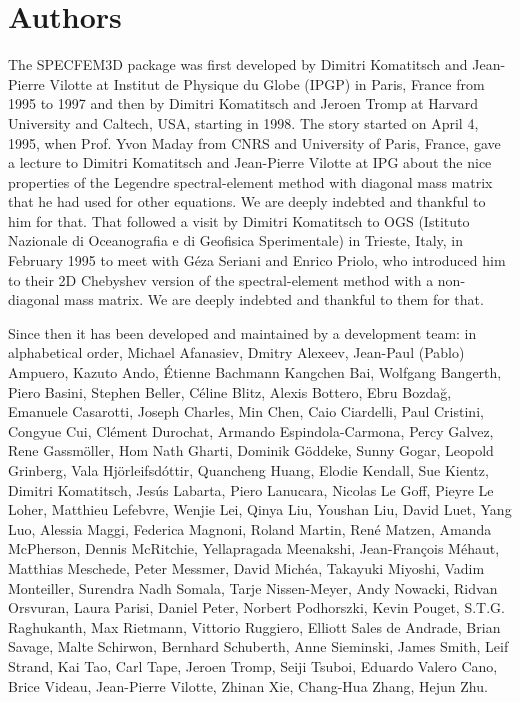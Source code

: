 \section*{Authors}

\noindent The SPECFEM3D package was first developed by Dimitri
Komatitsch and Jean-Pierre Vilotte at Institut de Physique du Globe
(IPGP) in Paris, France from 1995 to 1997 and then by Dimitri Komatitsch
and Jeroen Tromp at Harvard University and Caltech, USA, starting in 1998.
The story started on April 4, 1995, when Prof. Yvon Maday from CNRS and University of Paris, France, gave a lecture to
Dimitri Komatitsch and Jean-Pierre Vilotte at IPG about the nice properties of the Legendre spectral-element method with diagonal mass matrix that he had used for
other equations. We are deeply indebted and thankful to him for that.
That followed a visit by Dimitri Komatitsch to OGS (Istituto Nazionale di Oceanografia e di Geofisica Sperimentale) in Trieste, Italy, in February 1995
to meet with G\'eza Seriani and Enrico Priolo, who introduced him to their 2D Chebyshev version of the spectral-element method with a non-diagonal mass matrix.
We are deeply indebted and thankful to them for that.\newline

Since then it has been developed and maintained by a development team: in alphabetical order,
Michael Afanasiev,
Dmitry Alexeev,
Jean-Paul (Pablo) Ampuero,
Kazuto Ando,
\'Etienne Bachmann
Kangchen Bai,
Wolfgang Bangerth,
Piero Basini,
Stephen Beller,
C\'eline Blitz,
Alexis Bottero,
Ebru Bozda\u{g},
Emanuele Casarotti,
Joseph Charles,
Min Chen,
Caio Ciardelli,
Paul Cristini,
Congyue Cui,
Cl\'ement Durochat,
Armando Espindola-Carmona,
Percy Galvez,
Rene Gassm\"oller,
Hom Nath Gharti,
Dominik G\"oddeke,
Sunny Gogar,
Leopold Grinberg,
Vala Hj\"orleifsd\'ottir,
Quancheng Huang,
Elodie Kendall,
Sue Kientz,
Dimitri Komatitsch,
Jes\'us Labarta,
Piero Lanucara,
Nicolas Le Goff,
Pieyre Le Loher,
Matthieu Lefebvre,
Wenjie Lei,
Qinya Liu,
Youshan Liu,
David Luet,
Yang Luo,
Alessia Maggi,
Federica Magnoni,
Roland Martin,
Ren\'e Matzen,
Amanda McPherson,
Dennis McRitchie,
Yellapragada Meenakshi,
Jean-Fran\c{c}ois M\'ehaut,
Matthias Meschede,
Peter Messmer,
David Mich\'ea,
Takayuki Miyoshi,
Vadim Monteiller,
Surendra Nadh Somala,
Tarje Nissen-Meyer,
Andy Nowacki,
Ridvan Orsvuran,
Laura Parisi,
Daniel Peter,
Norbert Podhorszki,
Kevin Pouget,
S.T.G. Raghukanth,
Max Rietmann,
Vittorio Ruggiero,
Elliott Sales de Andrade,
Brian Savage,
Malte Schirwon,
Bernhard Schuberth,
Anne Sieminski,
James Smith,
Leif Strand,
Kai Tao,
Carl Tape,
Jeroen Tromp,
Seiji Tsuboi,
Eduardo Valero Cano,
Brice Videau,
Jean-Pierre Vilotte,
Zhinan Xie,
Chang-Hua Zhang,
Hejun Zhu.\newline


